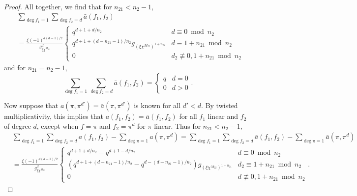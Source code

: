 \documentclass[11pt,letterpaper]{article}
\theoremstyle{definition}
\theoremstyle{remark}
\numberwithin{equation}{section}
\theoremstyle{dotless}
\begin{document}
\begin{proof}
All together, we find that for $n_{21}<n_2-1$,
\begin{equation*}
\begin{split}
& \sum_{\deg f_1 = 1} \sum_{\deg f_2=d} \bar{a}(f_1, f_2) \\
&=\frac{\xi(-1)^{d(d-1)/2}}{g_{\xi \chi^{M_{22}}}^{d}} \left\lbrace \begin{array}{cc} 
q^{d+1+d/n_2} & d \equiv 0 \bmod n_2 \\
q^{d+1+(d-n_{21}-1)/n_2}g_{(\xi \chi^{M_{22}})^{1+n_{21}}} & d \equiv 1+n_{21} \bmod n_2 \\
0 & d_2 \not \equiv 0, 1+n_{21} \bmod n_2
\end{array} \right.
\end{split}
\end{equation*}
and for $n_{21}=n_2-1$,
\begin{equation*}
\sum_{\deg f_1 = 1} \sum_{\deg f_2=d} \bar{a}(f_1, f_2)=\left\lbrace \begin{array}{cc} q & d=0 \\ 0 & d>0 \end{array} \right. .
\end{equation*}

Now suppose that $a(\pi, \pi^{d'})=\bar{a}(\pi, \pi^{d'})$ is known for all $d'<d$. By twisted multiplicativity, this implies that $a(f_1, f_2)=\bar{a}(f_1, f_2)$ for all $f_1$ linear and $f_2$ of degree $d$, except when $f=\pi$ and $f_2=\pi^{d}$ for $\pi$ linear. Thus for $n_{21}<n_2-1$,
\begin{equation*}
\begin{split}
&\sum_{\deg f_1 = 1} \sum_{\deg f_2 = d} a(f_1, f_2) - \sum_{\deg \pi = 1} a(\pi, \pi^{d})  =\sum_{\deg f_1 = 1} \sum_{\deg f_2 = d} \bar{a}(f_1, f_2) - \sum_{\deg \pi = 1} \bar{a}(\pi, \pi^{d})  \\
&=\frac{\xi(-1)^{d(d-1)/2}}{g_{\xi \chi^{M_{22}}}^{d}} \left\lbrace \begin{array}{cc} 
q^{d+1+d/n_2}-q^{d+1-d/n_2} & d \equiv 0 \bmod n_2 \\
(q^{d+1+(d-n_{21}-1)/n_2}-q^{d-(d-n_{21}-1)/n_2})g_{(\xi \chi^{M_{22}})^{1+n_{21}}} & d_2 \equiv 1+n_{21} \bmod n_2 \\
0 & d \not \equiv 0, 1+n_{21} \bmod n_2
\end{array} \right. .
\end{split}
\end{equation*}


\end{proof}
\end{document}
